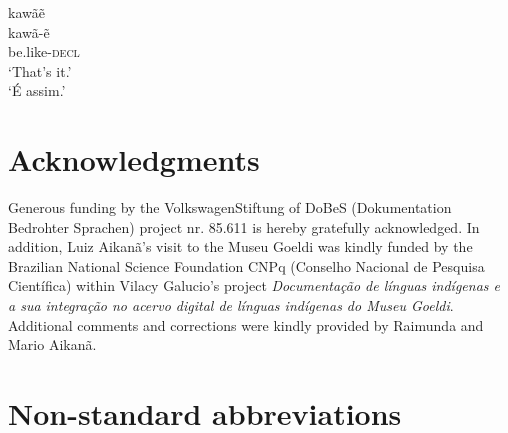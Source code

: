 \documentclass[output=paper,
modfonts,nonflat
]{langsci/langscibook}
\begin{document}
\ea   kawãẽ \\[.3em]
\gll 	kawã-ẽ \\
be.like-\textsc{decl}\\
\glt   `That's it.'  \\
`É assim.'
\z
 





 \section*{Acknowledgments}
Generous funding by the VolkswagenStiftung of DoBeS (Dokumentation Bedrohter Sprachen) project nr. 85.611 is hereby gratefully acknowledged. 
In addition, Luiz Aikanã's visit to the Museu Goeldi was kindly funded by the Brazilian National Science Foundation CNPq (Conselho Nacional de Pesquisa Científica) within Vilacy Galucio's project \textit{Documentação de línguas indígenas e a sua integração no acervo digital de línguas indígenas do Museu Goeldi}. Additional comments and corrections were kindly provided by Raimunda and Mario Aikanã. 
 
\section*{Non-standard abbreviations}
\end{document}
